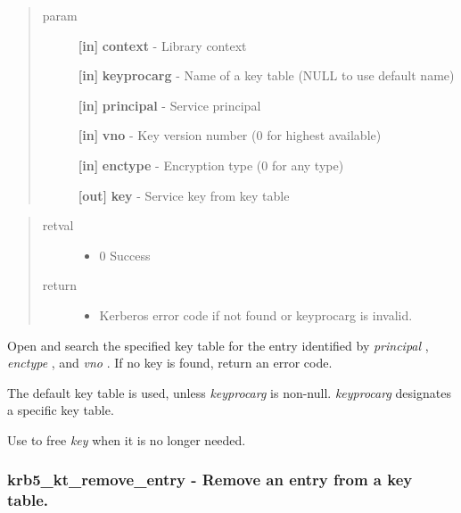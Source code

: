 \documentclass[letterpaper,10pt,english]{sphinxmanual}
\begin{document}
\begin{quote}\begin{description}
\item[{param}] \leavevmode
\textbf{{[}in{]}} \textbf{context} - Library context

\textbf{{[}in{]}} \textbf{keyprocarg} - Name of a key table (NULL to use default name)

\textbf{{[}in{]}} \textbf{principal} - Service principal

\textbf{{[}in{]}} \textbf{vno} - Key version number (0 for highest available)

\textbf{{[}in{]}} \textbf{enctype} - Encryption type (0 for any type)

\textbf{{[}out{]}} \textbf{key} - Service key from key table

\end{description}\end{quote}
\begin{quote}\begin{description}
\item[{retval}] \leavevmode\begin{itemize}
\item {} 
0   Success

\end{itemize}

\item[{return}] \leavevmode\begin{itemize}
\item {} 
Kerberos error code if not found or keyprocarg is invalid.

\end{itemize}

\end{description}\end{quote}

Open and search the specified key table for the entry identified by \emph{principal} , \emph{enctype} , and \emph{vno} . If no key is found, return an error code.

The default key table is used, unless \emph{keyprocarg} is non-null. \emph{keyprocarg} designates a specific key table.

Use {\hyperref[appdev/refs/api/krb5_free_keyblock:krb5_free_keyblock]{}} to free \emph{key} when it is no longer needed.


\subsubsection{krb5\_kt\_remove\_entry -  Remove an entry from a key table.}
\label{appdev/refs/api/krb5_kt_remove_entry::doc}\label{appdev/refs/api/krb5_kt_remove_entry:krb5-kt-remove-entry-remove-an-entry-from-a-key-table}
\end{document}
